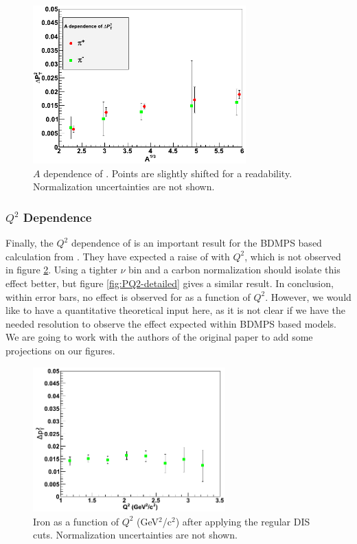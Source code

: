 \begin{figure}[tbp]
\centering
\includegraphics[width=8.2cm] {chap6-fig/F_PvA.png} 
\caption {$A$ dependence of \dptp. Points are slightly shifted for a readability. Normalization uncertainties are not shown.}
\label{fig:PA}
\end{figure}

\subsubsection{$Q^2$ Dependence}

Finally, the $Q^2$ dependence of \dpt is an important result for the BDMPS based 
calculation from \cite{Domdey:2008aq}. They have expected a raise of \dpt with $Q^2$, 
which is not observed in figure \ref{fig:PQ2}. Using a tighter $\nu$ bin and a 
carbon normalization should isolate this effect better, but figure \ref{fig:PQ2-detailed}
gives a similar result. In conclusion, within error bars, no effect is observed for 
\dpt as a function of $Q^2$. However, we would like to have a quantitative theoretical 
input here, as it is not clear if we have the needed resolution to observe the effect 
expected within BDMPS based models. We are going to work with the authors of the original 
paper to add some projections on our figures.

\begin{figure}[tbp]
\centering
\includegraphics[width=7.4cm] {chap6-fig/F_PvQ2.png} 
\caption {Iron \dpt as a function of $Q^2$ (GeV$^2$/c$^2$) after applying the regular DIS cuts. Normalization uncertainties are not shown.}
\label{fig:PQ2}
\end{figure}

